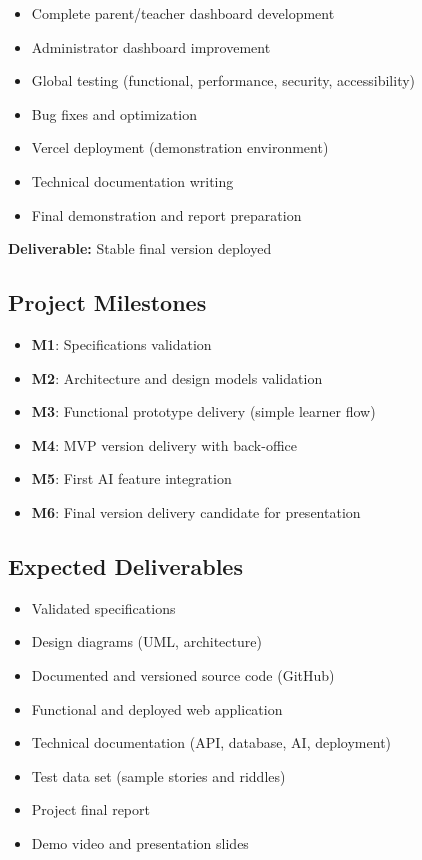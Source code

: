 \documentclass[12pt,a4paper]{article}
\begin{document}
\begin{itemize}
    \item Complete parent/teacher dashboard development
    \item Administrator dashboard improvement
    \item Global testing (functional, performance, security, accessibility)
    \item Bug fixes and optimization
    \item Vercel deployment (demonstration environment)
    \item Technical documentation writing
    \item Final demonstration and report preparation
\end{itemize}

\textbf{Deliverable:} Stable final version deployed

\subsection{Project Milestones}

\begin{itemize}
    \item \textbf{M1}: Specifications validation
    \item \textbf{M2}: Architecture and design models validation
    \item \textbf{M3}: Functional prototype delivery (simple learner flow)
    \item \textbf{M4}: MVP version delivery with back-office
    \item \textbf{M5}: First AI feature integration
    \item \textbf{M6}: Final version delivery candidate for presentation
\end{itemize}

\subsection{Expected Deliverables}

\begin{itemize}
    \item Validated specifications
    \item Design diagrams (UML, architecture)
    \item Documented and versioned source code (GitHub)
    \item Functional and deployed web application
    \item Technical documentation (API, database, AI, deployment)
    \item Test data set (sample stories and riddles)
    \item Project final report
    \item Demo video and presentation slides
\end{itemize}
\end{document}
